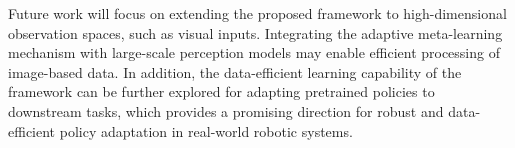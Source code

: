 \documentclass[journal]{IEEEtran}
\begin{document}
Future work will focus on extending the proposed framework to high-dimensional observation spaces, such as visual inputs. Integrating the adaptive meta-learning mechanism with large-scale perception models may enable efficient processing of image-based data. In addition, the data-efficient learning capability of the framework can be further explored for adapting pretrained policies to downstream tasks, which provides a promising direction for robust and data-efficient policy adaptation in real-world robotic systems.



















\end{document}
